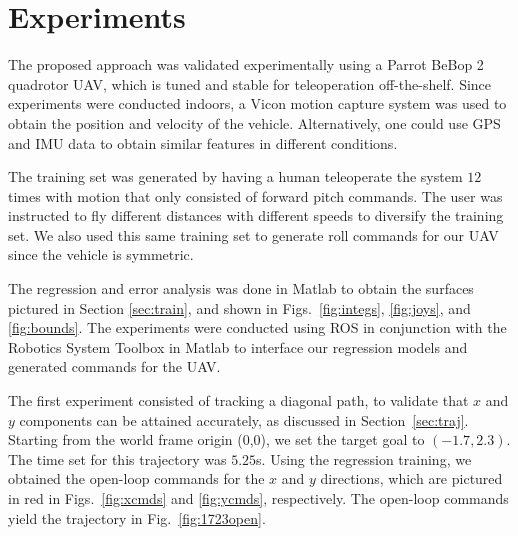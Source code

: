 \documentclass[letterpaper, 10 pt, conference]{ieeeconf}  %
\newcommand\NB[1]{$\spadesuit$\footnote{NB: #1}}
\begin{document}


\section{Experiments} \label{sec:exper}
The proposed approach was validated experimentally using a Parrot BeBop 2 quadrotor UAV, which is tuned and stable for teleoperation off-the-shelf. Since experiments were conducted indoors, a Vicon motion capture system was used to obtain the position and velocity of the vehicle. Alternatively, one could use GPS and IMU data to obtain similar features in different conditions. 

The training set was generated by having a human teleoperate the system $12$ times with motion that only consisted of forward pitch commands. The user was instructed to fly different distances with different speeds to diversify the training set. We also used this same training set to generate roll commands for our UAV since the vehicle is symmetric.

The regression and error analysis was done in Matlab to obtain the surfaces pictured in Section \ref{sec:train}, and shown in Figs.~\ref{fig:integs}, \ref{fig:joys}, and \ref{fig:bounds}. The experiments were conducted using ROS in conjunction with the Robotics System Toolbox in Matlab to interface our regression models and generated commands for the UAV.

The first experiment consisted of tracking a diagonal path, to validate that $x$ and $y$ components can be attained accurately, as discussed in Section~\ref{sec:traj}. Starting from the world frame origin (0,0), we set the target goal to $(-1.7,2.3)$. The time set for this trajectory was $5.25$s. Using the regression training, we obtained the open-loop commands for the $x$ and $y$ directions, which are pictured in red in Figs.~\ref{fig:xcmds} and \ref{fig:ycmds}, respectively. The open-loop commands yield the trajectory in Fig.~\ref{fig:1723open}.
\end{document}
